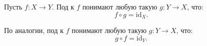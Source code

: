 \begin{definition*}
    Пусть $f\colon X \rightarrow Y$. Под  к $f$ понимают любую такую $g\colon Y
    \rightarrow X$, что:
    $$
        f \circ g = \mathrm{id}_X.
    $$

    По аналогии, под  к $f$ понимают любую такую $g\colon Y \rightarrow X$, что:
    $$
        g \circ f = \mathrm{id}_Y.
    $$
\end{definition*}






